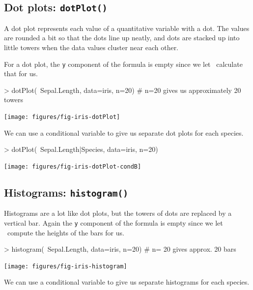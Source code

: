 \subsection{Dot plots: \texttt{dotPlot()}}

A dot plot represents each value of a quantitative variable with a dot.  The values
are rounded a bit so that the dots line up neatly, and dots are stacked up into little
towers when the data values cluster near each other.

For a dot plot, the \verb!y! component of the formula is empty since we let \R\
calculate that for us.

\begin{center}
\begin{Schunk}
\begin{Sinput}
> dotPlot(~Sepal.Length, data=iris, n=20)   # n=20 gives us approximately 20 towers
\end{Sinput}
\end{Schunk}
\texttt{[image: figures/fig-iris-dotPlot]}
\end{center}
We can use a conditional variable to give us separate dot plots for each species.

\begin{Schunk}
\begin{Sinput}
> dotPlot(~Sepal.Length|Species, data=iris, n=20)
\end{Sinput}
\end{Schunk}
\begin{center}
\texttt{[image: figures/fig-iris-dotPlot-condB]}
\end{center}

\subsection{Histograms: \texttt{histogram()}}

Histograms are a lot like dot plots, but the towers of dots are replaced by a vertical bar.
Again the \verb!y! component of the formula is empty since we let \R\
compute the heights of the bars for us.
\begin{center}
\begin{Schunk}
\begin{Sinput}
> histogram(~Sepal.Length, data=iris, n=20)       # n= 20 gives approx. 20 bars
\end{Sinput}
\end{Schunk}
\texttt{[image: figures/fig-iris-histogram]}
\end{center}
We can use a conditional variable to give us separate histograms for each species.

